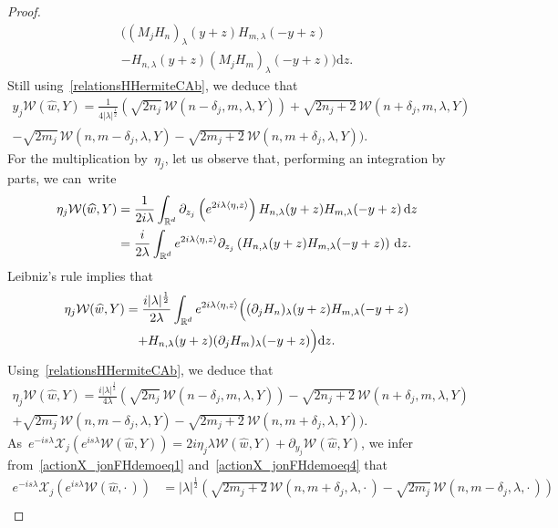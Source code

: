 \documentclass[AHL,Unicode,longabstracts]{cedram}
\let\wh=\widehat
\def\R{{\mathop{\mathbb R\kern 0pt}\nolimits}}
\newcommand{\lam}{\lambda}
\newcommand{\wh}{\widehat}
\newcommand*\cW{\mathcal{W}}
\newcommand*\cX{\mathcal{X}}
\newcommand*\R{\mathbb{R}}
\newcommand*{\dd}{\mathrm{d}}
\newcommand{\dz}{\dd z}
\renewcommand*{\cdotp}{.}
\begin{document}
\begin{proof}
\begin{multline*}
\Big((M_jH_n)_\lam (y+z) H_{m,\lam}(-y+z)\\
- H_{n,\lam}(y+z) (M_jH_m)_\lam(-y+z)\Big)\dz.
\end{multline*}
Still using~\eqref{relationsHHermiteCAb}, we deduce that
\begin{multline}\label{actionX_jonFHdemoeq3}
\!\! y_j \cW(\wh w,Y) = \frac 1 {4|\lam|^{\frac 12} } \left(\sqrt {2n_j} \,\cW(n\!-\!\delta_j,m,\lam,Y) \right)\!+\!\sqrt {2n_j\!+\!2}\,\cW(n\!+\!\delta_j,m,\lam,Y) \\
-\sqrt {2m_j}\,\cW(n,m-\delta_j,\lam,Y) -\sqrt {2m_j+2}\,\cW(n,m+\delta_j,\lam,Y)).\!\!
\end{multline}
For the multiplication by~$\eta_j$, let us observe that, performing an integration by parts, we can~write
\[
\begin{aligned}
\eta_j\cW(\wh w,Y) & = \frac 1 {2i\lam} \int_{\R^d} \partial_{z_j} \left(e^{2i\lam\langle \eta,z\rangle} \right) H_{n,\lam} (y+z) H_{m,\lam}(-y+z)\, \dz\\
& = \frac i {2\lam} \int_{\R^d} e^{2i\lam\langle \eta,z\rangle}\partial_{z_j} \left(H_{n,\lam} (y+z) H_{m,\lam}(-y+z) \right)\,\dz.
\end{aligned}
\]
Leibniz's rule implies that
\begin{multline*}
\eta_j\cW(\wh w,Y) = \frac {i|\lam|^{\frac 12}} {2\lam} \int_{\R^d} e^{2i\lam\langle \eta,z\rangle} \Big((\partial_jH_{n})_\lam (y+z) H_{m,\lam}(-y+z) \\
+ H_{n,\lam} (y+z) (\partial_j H_m)_\lam (-y+z) \Big)\dz.
\end{multline*}
Using~\eqref{relationsHHermiteCAb}, we deduce that
\begin{multline}\label{actionX_jonFHdemoeq4}
\!\!\eta_j \cW(\wh w,Y) = \frac {i |\lam|^{\frac 12} } {4\lam} (\sqrt {2n_j} \,\cW(n\!-\!\delta_j,m,\lam,Y)) -\sqrt {2n_j\!+\!2}\, \cW(n\!+\!\delta_j,m,\lam,Y) \\
+\sqrt {2m_j}\,\cW(n,m-\delta_j,\lam,Y) -\sqrt {2m_j+2}\,\cW(n,m+\delta_j,\lam,Y))\cdotp\!\!
\end{multline}
As~$e^{-is\lam} \cX_j\left(e^{is\lam}\cW(\wh w,Y) \right) = 2i\eta_j \lam\cW(\wh w,Y) +\partial_{y_j} \cW(\wh w,Y)$, we infer from~\eqref{actionX_jonFHdemoeq1} and~\eqref{actionX_jonFHdemoeq4} that
\[
\begin{aligned}
e^{-is\lam} \cX_j\left(e^{is\lam}\cW(\wh w,{\cdot\,}) \right) &\! =\! |\lam|^{\frac 12} \left(\sqrt {2m_j\!+\!2}\,\cW(n,m\!+\!\delta_j,\lam,{\cdot\,})-\sqrt {2m_j}\,\cW(n,m\!-\!\delta_j,\lam,{\cdot\,})\right)\\

\end{aligned}\]
\end{proof}
\end{document}
